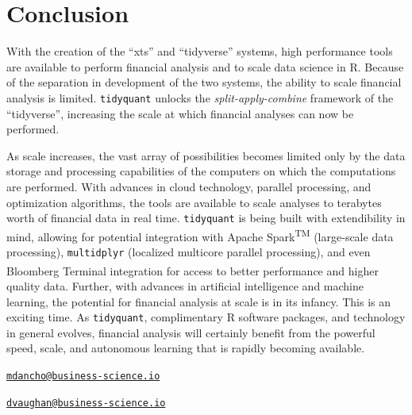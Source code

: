 \hspace{20 mm}

\section{Conclusion}\label{conclusion}

With the creation of the ``xts'' and ``tidyverse'' systems, high
performance tools are available to perform financial analysis and to
scale data science in R. Because of the separation in development of the
two systems, the ability to scale financial analysis is limited.
\texttt{tidyquant} unlocks the \emph{split-apply-combine} framework of
the ``tidyverse'', increasing the scale at which financial analyses can
now be performed.

As scale increases, the vast array of possibilities becomes limited only
by the data storage and processing capabilities of the computers on
which the computations are performed. With advances in cloud technology,
parallel processing, and optimization algorithms, the tools are
available to scale analyses to terabytes worth of financial data in real
time. \texttt{tidyquant} is being built with extendibility in mind,
allowing for potential integration with Apache Spark\textsuperscript{TM}
(large-scale data processing), \texttt{multidplyr} (localized multicore
parallel processing), and even Bloomberg
Terminal\textsuperscript{\textregistered} integration for access to
better performance and higher quality data. Further, with advances in
artificial intelligence and machine learning, the potential for
financial analysis at scale is in its infancy. This is an exciting time.
As \texttt{tidyquant}, complimentary R software packages, and technology
in general evolves, financial analysis will certainly benefit from the
powerful speed, scale, and autonomous learning that is rapidly becoming
available.

\pagebreak



\address{%
Matt Dancho\\
Business Science\\
\\
}
\href{mailto:mdancho@business-science.io}{\nolinkurl{mdancho@business-science.io}}

\address{%
Davis Vaughan\\
Business Science\\
\\
}
\href{mailto:dvaughan@business-science.io}{\nolinkurl{dvaughan@business-science.io}}


